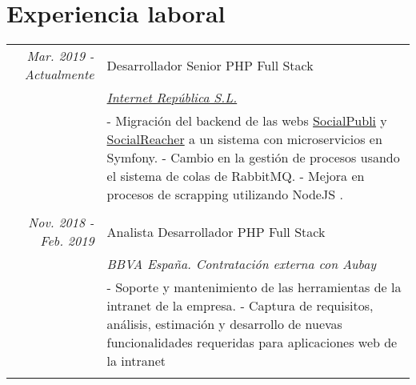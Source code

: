 \documentclass[a4paper,10pt]{article}
\begin{document}
\section{Experiencia laboral}
\begin{tabular}{r|p{11cm}}
 	\emph{Mar. 2019 - Actualmente}&		Desarrollador Senior PHP Full Stack \\&
	\emph{\href{https://internetrepublica.com/}{Internet República S.L.}}\\&
 	\footnotesize{
 		- Migración del backend de las webs \href{http://socialpubli.com}{SocialPubli} y \href{http://socialreacher.com}{SocialReacher} a un sistema con microservicios en Symfony.\newline
 		- Cambio en la gestión de procesos usando el sistema de colas de RabbitMQ.\newline
 		- Mejora en procesos de scrapping utilizando NodeJS .\newline
 	}\\
 	\multicolumn{2}{c}{} \\

 	\emph{Nov. 2018 - Feb. 2019}&		Analista Desarrollador PHP Full Stack \\&
 	\emph{BBVA España. Contratación externa con Aubay}\\&
 	\footnotesize{
 		- Soporte y mantenimiento de las herramientas de la intranet de la empresa.\newline
		- Captura de requisitos, análisis, estimación y desarrollo de nuevas funcionalidades requeridas para aplicaciones web de la intranet
 	}\\
 	\multicolumn{2}{c}{} \\
 	


\end{tabular}
\end{document}
